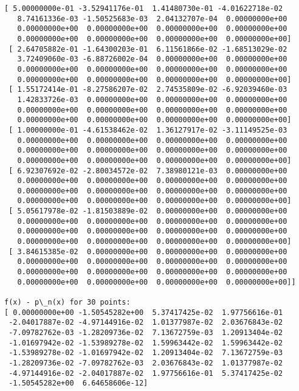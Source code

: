 \documentclass[11pt]{article}
\begin{document}
\begin{Verbatim}[commandchars=\\\{\}]
 [ 5.00000000e-01 -3.52941176e-01  1.41480730e-01 -4.01622718e-02
   8.74161336e-03 -1.50525683e-03  2.04132707e-04  0.00000000e+00
   0.00000000e+00  0.00000000e+00  0.00000000e+00  0.00000000e+00
   0.00000000e+00  0.00000000e+00  0.00000000e+00  0.00000000e+00]
 [ 2.64705882e-01 -1.64300203e-01  6.11561866e-02 -1.68513029e-02
   3.72409060e-03 -6.88726002e-04  0.00000000e+00  0.00000000e+00
   0.00000000e+00  0.00000000e+00  0.00000000e+00  0.00000000e+00
   0.00000000e+00  0.00000000e+00  0.00000000e+00  0.00000000e+00]
 [ 1.55172414e-01 -8.27586207e-02  2.74535809e-02 -6.92039460e-03
   1.42833726e-03  0.00000000e+00  0.00000000e+00  0.00000000e+00
   0.00000000e+00  0.00000000e+00  0.00000000e+00  0.00000000e+00
   0.00000000e+00  0.00000000e+00  0.00000000e+00  0.00000000e+00]
 [ 1.00000000e-01 -4.61538462e-02  1.36127917e-02 -3.11149525e-03
   0.00000000e+00  0.00000000e+00  0.00000000e+00  0.00000000e+00
   0.00000000e+00  0.00000000e+00  0.00000000e+00  0.00000000e+00
   0.00000000e+00  0.00000000e+00  0.00000000e+00  0.00000000e+00]
 [ 6.92307692e-02 -2.80034572e-02  7.38980121e-03  0.00000000e+00
   0.00000000e+00  0.00000000e+00  0.00000000e+00  0.00000000e+00
   0.00000000e+00  0.00000000e+00  0.00000000e+00  0.00000000e+00
   0.00000000e+00  0.00000000e+00  0.00000000e+00  0.00000000e+00]
 [ 5.05617978e-02 -1.81503889e-02  0.00000000e+00  0.00000000e+00
   0.00000000e+00  0.00000000e+00  0.00000000e+00  0.00000000e+00
   0.00000000e+00  0.00000000e+00  0.00000000e+00  0.00000000e+00
   0.00000000e+00  0.00000000e+00  0.00000000e+00  0.00000000e+00]
 [ 3.84615385e-02  0.00000000e+00  0.00000000e+00  0.00000000e+00
   0.00000000e+00  0.00000000e+00  0.00000000e+00  0.00000000e+00
   0.00000000e+00  0.00000000e+00  0.00000000e+00  0.00000000e+00
   0.00000000e+00  0.00000000e+00  0.00000000e+00  0.00000000e+00]]

f(x) - p\_n(x) for 30 points:
[ 0.00000000e+00 -1.50545282e+00  5.37417425e-02  1.97756616e-01
 -2.04017887e-02 -4.97144916e-02  1.01377987e-02  2.03676843e-02
 -7.09782762e-03 -1.28209736e-02  7.13672759e-03  1.20913404e-02
 -1.01697942e-02 -1.53989278e-02  1.59963442e-02  1.59963442e-02
 -1.53989278e-02 -1.01697942e-02  1.20913404e-02  7.13672759e-03
 -1.28209736e-02 -7.09782762e-03  2.03676843e-02  1.01377987e-02
 -4.97144916e-02 -2.04017887e-02  1.97756616e-01  5.37417425e-02
 -1.50545282e+00  6.64658606e-12]

    \end{Verbatim}


    
    
    
\end{document}
